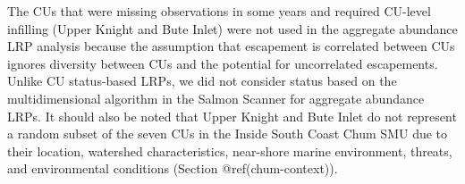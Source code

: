 \documentclass[
]{article}
\begin{document}
The CUs that were missing observations in some years and required
CU-level infilling (Upper Knight and Bute Inlet) were not used in the
aggregate abundance LRP analysis because the assumption that escapement
is correlated between CUs ignores diversity between CUs and the
potential for uncorrelated escapements. Unlike CU status-based LRPs, we
did not consider status based on the multidimensional algorithm in the
Salmon Scanner for aggregate abundance LRPs. It should also be noted
that Upper Knight and Bute Inlet do not represent a random subset of the
seven CUs in the Inside South Coast Chum SMU due to their location,
watershed characteristics, near-shore marine environment, threats, and
environmental conditions (Section @ref(chum-context)).
\end{document}
